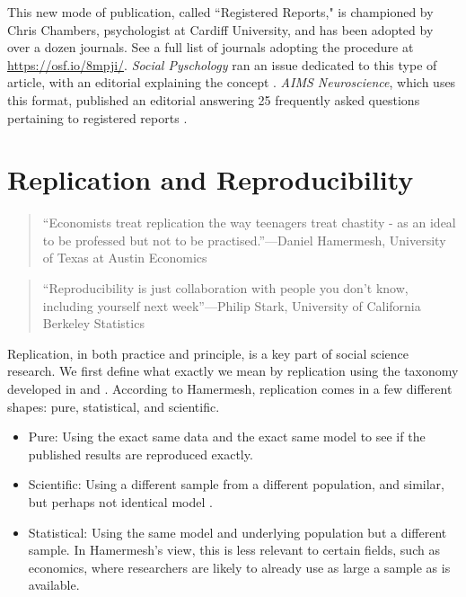 \documentclass[12pt] {article}
\begin{document}
This new mode of publication, called ``Registered Reports," is championed by Chris Chambers, psychologist at Cardiff University, and has been adopted by over a dozen journals. See a full list of journals adopting the procedure at \url{https://osf.io/8mpji/}. \textit{Social Pyschology} ran an issue dedicated to this type of article, with an editorial explaining the concept \citep{nosek2014registered}. \textit{AIMS Neuroscience}, which uses this format, published an editorial answering 25 frequently asked questions pertaining to registered reports \citep{chambers2014instead}. 

  


\section{Replication and
Reproducibility}\label{replication-and-reproducibility}

\begin{quote}
``Economists treat replication the way teenagers treat chastity - as an
ideal to be professed but not to be practised.''---Daniel Hamermesh,
University of Texas at Austin Economics
\end{quote}

\begin{quote}
``Reproducibility is just collaboration with people you don't know,
including yourself next week''---Philip Stark, University of California Berkeley Statistics
\end{quote}

Replication, in both practice and principle, is a key part of social
science research. We first define what exactly we mean by replication
using the taxonomy developed in \cite{hamermesh_viewpoint:_2007} and \cite{hunter_desperate_2001}.
According to Hamermesh, replication comes in a few different shapes: pure, statistical, and
scientific.

\begin{itemize}
\item
  Pure: Using the exact same data and the exact same model to see if the
  published results are reproduced exactly.
\item
  Scientific: Using a different sample from a different population, and
  similar, but perhaps not identical model .
\item
  Statistical: Using the same model and underlying population but a
  different sample. In Hamermesh's view, this is less relevant to certain fields, such as economics,
  where researchers are likely to already use as large a sample as is available.
\end{itemize}
\end{document}
